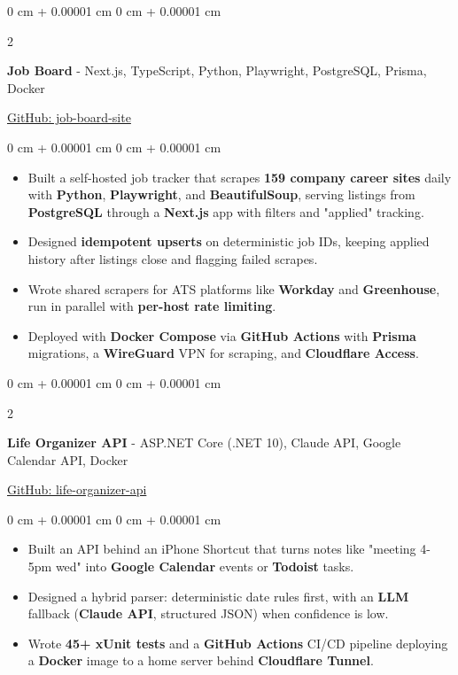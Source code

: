 \documentclass[9pt, letterpaper]{extarticle}
\newenvironment{highlights}{
    \begin{itemize}[
        topsep=0.10 cm,
        parsep=0.10 cm,
        partopsep=0pt,
        itemsep=0pt,
        leftmargin=0 cm + 10pt
    ]
}{
    \end{itemize}
} %
\newenvironment{onecolentry}{
    \begin{adjustwidth}{
        0 cm + 0.00001 cm
    }{
        0 cm + 0.00001 cm
    }
}{
    \end{adjustwidth}
} %
\newenvironment{twocolentry}[2][]{
    \onecolentry
    \def\secondColumn{#2}
    \setcolumnwidth{\fill, 4.5 cm}
    \begin{paracol}{2}
}{
    \switchcolumn \raggedleft \secondColumn
    \end{paracol}
    \endonecolentry
} %
\begin{document}
        \begin{twocolentry}
        {\href{https://github.com/ayushtvora/job-board-site}{GitHub: job-board-site}}
            \textbf{Job Board} - Next.js, TypeScript, Python, Playwright, PostgreSQL, Prisma, Docker
        \end{twocolentry}
        \vspace{0.10 cm}
        \begin{onecolentry}
            \begin{highlights}
                \item Built a self-hosted job tracker that scrapes \textbf{159 company career sites} daily with \textbf{Python}, \textbf{Playwright}, and \textbf{BeautifulSoup}, serving listings from \textbf{PostgreSQL} through a \textbf{Next.js} app with filters and "applied" tracking.
                \item Designed \textbf{idempotent upserts} on deterministic job IDs, keeping applied history after listings close and flagging failed scrapes.
                \item Wrote shared scrapers for ATS platforms like \textbf{Workday} and \textbf{Greenhouse}, run in parallel with \textbf{per-host rate limiting}.
                \item Deployed with \textbf{Docker Compose} via \textbf{GitHub Actions} with \textbf{Prisma} migrations, a \textbf{WireGuard} VPN for scraping, and \textbf{Cloudflare Access}.
            \end{highlights}
        \end{onecolentry}

        \vspace{0.2 cm}

        \begin{twocolentry}
        {\href{https://github.com/ayushtvora/life-organizer-api}{GitHub: life-organizer-api}}
            \textbf{Life Organizer API} - ASP.NET Core (.NET 10), Claude API, Google Calendar API, Docker
        \end{twocolentry}
        \vspace{0.10 cm}
        \begin{onecolentry}
            \begin{highlights}
                \item Built an API behind an iPhone Shortcut that turns notes like "meeting 4-5pm wed" into \textbf{Google Calendar} events or \textbf{Todoist} tasks.
                \item Designed a hybrid parser: deterministic date rules first, with an \textbf{LLM} fallback (\textbf{Claude API}, structured JSON) when confidence is low.
                \item Wrote \textbf{45+ xUnit tests} and a \textbf{GitHub Actions} CI/CD pipeline deploying a \textbf{Docker} image to a home server behind \textbf{Cloudflare Tunnel}.
            \end{highlights}
        \end{onecolentry}
\end{document}
